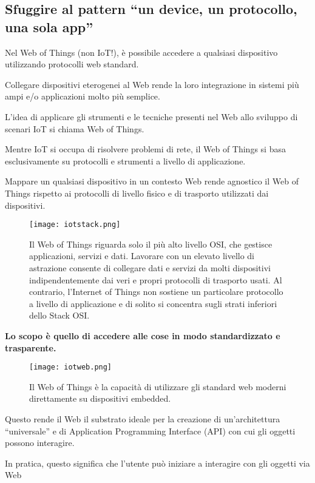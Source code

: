 \subsection{Sfuggire al pattern ``un device, un protocollo, una sola app''}

Nel Web of Things (non IoT!), è possibile accedere a qualsiasi dispositivo
utilizzando protocolli web standard.

Collegare dispositivi eterogenei al Web rende la loro integrazione in sistemi
più ampi e/o applicazioni molto più semplice.

L'idea di applicare gli strumenti e le tecniche presenti nel
Web allo sviluppo di scenari IoT si chiama Web of Things.

Mentre IoT si occupa di risolvere problemi di rete, il Web of Things si basa
esclusivamente su protocolli e strumenti a livello di applicazione.

Mappare un qualsiasi dispositivo in un contesto Web rende agnostico il
Web of Things rispetto ai protocolli di livello fisico e di trasporto
utilizzati dai dispositivi.

\begin{figure}[H]
  \centering
  \texttt{[image: iotstack.png]}
  \caption{Il Web of Things riguarda solo il più alto livello OSI, che
gestisce applicazioni, servizi e dati.
Lavorare con un elevato livello di astrazione consente di collegare dati
e servizi da molti dispositivi indipendentemente dai veri e propri protocolli
di trasporto usati.
Al contrario, l'Internet of Things non sostiene un particolare protocollo a
livello di applicazione e di solito si concentra sugli strati inferiori dello
Stack OSI.}
  \label{fig:iotstack}
\end{figure}

\textbf{Lo scopo è quello di accedere alle cose in modo standardizzato e
trasparente.}

\begin{figure}[H]
  \centering
  \texttt{[image: iotweb.png]}
  \caption{Il Web of Things è la capacità di utilizzare gli standard web moderni
direttamente su dispositivi embedded.}
  \label{fig:iotweb}
\end{figure}

Questo rende il Web il substrato ideale per la creazione di un'architettura
``universale'' e di Application Programming Interface (API) con cui gli oggetti possono
interagire.

In pratica, questo significa che l'utente può iniziare a interagire con gli oggetti
via Web

